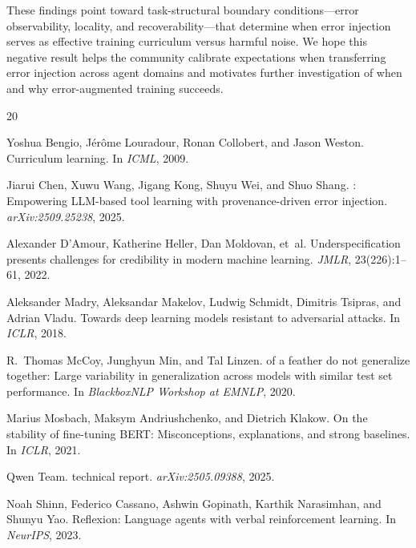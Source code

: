 \documentclass[11pt]{article}
\begin{document}
These findings point toward task-structural boundary conditions---error observability, locality, and recoverability---that determine when error injection serves as effective training curriculum versus harmful noise.
We hope this negative result helps the community calibrate expectations when transferring error injection across agent domains and motivates further investigation of when and why error-augmented training succeeds.

\begin{thebibliography}{20}

Yoshua Bengio, J{\'e}r{\^o}me Louradour, Ronan Collobert, and Jason Weston.
\newblock Curriculum learning.
\newblock In \emph{ICML}, 2009.

Jiarui Chen, Xuwu Wang, Jigang Kong, Shuyu Wei, and Shuo Shang.
: Empowering {LLM}-based tool learning with provenance-driven error injection.
\newblock \emph{arXiv:2509.25238}, 2025.

Alexander D'Amour, Katherine Heller, Dan Moldovan, et~al.
\newblock Underspecification presents challenges for credibility in modern machine learning.
\newblock \emph{JMLR}, 23(226):1--61, 2022.

Aleksander Madry, Aleksandar Makelov, Ludwig Schmidt, Dimitris Tsipras, and Adrian Vladu.
\newblock Towards deep learning models resistant to adversarial attacks.
\newblock In \emph{ICLR}, 2018.

R.~Thomas McCoy, Junghyun Min, and Tal Linzen.
 of a feather do not generalize together: Large variability in generalization across models with similar test set performance.
\newblock In \emph{BlackboxNLP Workshop at EMNLP}, 2020.

Marius Mosbach, Maksym Andriushchenko, and Dietrich Klakow.
\newblock On the stability of fine-tuning {BERT}: Misconceptions, explanations, and strong baselines.
\newblock In \emph{ICLR}, 2021.

{Qwen Team}.
 technical report.
\newblock \emph{arXiv:2505.09388}, 2025.

Noah Shinn, Federico Cassano, Ashwin Gopinath, Karthik Narasimhan, and Shunyu Yao.
\newblock Reflexion: Language agents with verbal reinforcement learning.
\newblock In \emph{NeurIPS}, 2023.


\end{thebibliography}
\end{document}
